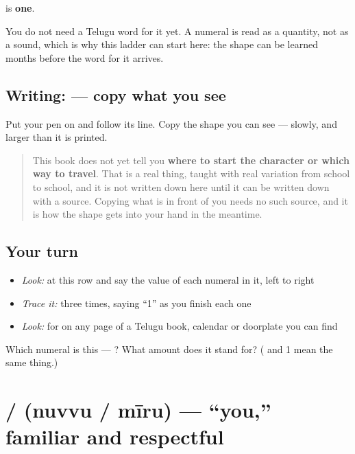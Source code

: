 \textbf{} is \textbf{one}.

You do not need a Telugu word for it yet. A numeral is read as a quantity, not as a sound, which is why this ladder can start here: the shape can be learned months before the word for it arrives.

\subsection*{Writing:  — copy what you see}
Put your pen on  and follow its line. Copy the shape you can see — slowly, and larger than it is printed.

\begin{quote}
This book does not yet tell you \textbf{where to start the character or which way to travel}. That is a real thing, taught with real variation from school to school, and it is not written down here until it can be written down with a source. Copying what is in front of you needs no such source, and it is how the shape gets into your hand in the meantime.
\end{quote}

\subsection*{Your turn}
\begin{itemize}
\raggedright
  \item \emph{Look:} at this row and say the value of each numeral in it, left to right
\end{itemize}

\begin{quote}
\end{quote}

\begin{itemize}
\raggedright
  \item \emph{Trace it:}  three times, saying \textquotedblleft{}1\textquotedblright{} as you finish each one
  \item \emph{Look:} for  on any page of a Telugu book, calendar or doorplate you can find
\end{itemize}

\begin{tcolorbox}[breakable,colback=teal!4,colframe=teal!35!black,title={Before you move on}]
Which numeral is this — ? What amount does it stand for? ( and 1 mean the same thing.)
\end{tcolorbox}
\section[\texorpdfstring{\te{నువ్వు} / \te{మీరు} (nuvvu / mīru)}{నువ్వు / మీరు (nuvvu / mīru)}]{ /  (nuvvu / mīru) — \textquotedblleft{}you,\textquotedblright{} familiar and respectful}

